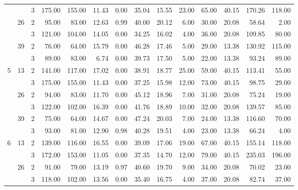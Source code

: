 \begin{tabular}{lllrrrrrrrrrrr}
  &    & 3 &   175.00 &    155.00 & 11.43 &    0.00 &   35.04 &   15.55 &   23.00 &   65.00 &   40.15 & 170.26 &   118.00 \\
\cline{2-14}
  & \multirow{2}{*}{26} & 2 &    95.00 &     83.00 & 12.63 &    0.99 &   40.00 &   20.12 &    6.00 &   30.00 &   20.08 &  58.64 &     2.00 \\
  &    & 3 &   121.00 &    104.00 & 14.05 &    0.00 &   34.25 &   16.02 &    4.00 &   36.00 &   20.08 & 109.85 &    80.00 \\
\cline{2-14}
  & \multirow{2}{*}{39} & 2 &    76.00 &     64.00 & 15.79 &    0.00 &   46.28 &   17.46 &    5.00 &   29.00 &   13.38 & 130.92 &   115.00 \\
  &    & 3 &    89.00 &     83.00 &  6.74 &    0.00 &   39.73 &   17.50 &    5.00 &   22.00 &   13.38 &  93.24 &    89.00 \\
\cline{1-14}
\cline{2-14}
\multirow{6}{*}{5} & \multirow{2}{*}{13} & 2 &   141.00 &    117.00 & 17.02 &    0.00 &   38.91 &   18.77 &   25.00 &   59.00 &   40.15 & 113.41 &    55.00 \\
  &    & 3 &   175.00 &    155.00 & 11.43 &    0.00 &   37.25 &   15.98 &   12.00 &   73.00 &   40.15 &  98.75 &    29.00 \\
\cline{2-14}
  & \multirow{2}{*}{26} & 2 &    94.00 &     83.00 & 11.70 &    0.00 &   45.12 &   18.96 &    7.00 &   31.00 &   20.08 &  75.24 &    19.00 \\
  &    & 3 &   122.00 &    102.00 & 16.39 &    0.00 &   41.76 &   18.89 &   10.00 &   32.00 &   20.08 & 139.57 &    85.00 \\
\cline{2-14}
  & \multirow{2}{*}{39} & 2 &    75.00 &     64.00 & 14.67 &    0.00 &   47.24 &   20.03 &    7.00 &   24.00 &   13.38 & 116.60 &    70.00 \\
  &    & 3 &    93.00 &     81.00 & 12.90 &    0.98 &   40.28 &   19.51 &    4.00 &   23.00 &   13.38 &  66.24 &     4.00 \\
\cline{1-14}
\cline{2-14}
\multirow{6}{*}{6} & \multirow{2}{*}{13} & 2 &   139.00 &    116.00 & 16.55 &    0.00 &   39.09 &   17.06 &   19.00 &   67.00 &   40.15 & 155.14 &   118.00 \\
  &    & 3 &   172.00 &    153.00 & 11.05 &    0.00 &   37.35 &   14.70 &   12.00 &   79.00 &   40.15 & 235.03 &   196.00 \\
\cline{2-14}
  & \multirow{2}{*}{26} & 2 &    91.00 &     79.00 & 13.19 &    0.97 &   40.60 &   19.70 &    9.00 &   34.00 &   20.08 &  70.02 &    23.00 \\
  &    & 3 &   118.00 &    102.00 & 13.56 &    0.00 &   35.40 &   16.75 &    4.00 &   37.00 &   20.08 &  82.74 &    37.00 \\

\end{tabular}
